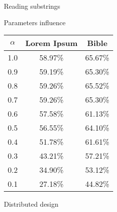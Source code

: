 \documentclass[aspectratio=169]{beamer}
\begin{document}
\begin{frame}{Reading substrings}\centering
  
\end{frame}


\begin{frame}{Parameters influence}
 \begin{table}
    \centering
    \begin{tabular}{c || c  c}
      $\alpha$ & Lorem Ipsum & Bible \\\hline\hline
      1.0 & 58.97\% & 65.67\% \\\hline
      0.9 & 59.19\% & 65.30\% \\\hline
      0.8 & 59.26\% & 65.52\% \\\hline
      0.7 & 59.26\% & 65.30\% \\\hline
      0.6 & 57.58\% & 61.13\% \\\hline
      0.5 & 56.55\% & 64.10\% \\\hline
      0.4 & 51.78\% & 61.61\% \\\hline
      0.3 & 43.21\% & 57.21\% \\\hline
      0.2 & 34.90\% & 53.12\% \\\hline
      0.1 & 27.18\% & 44.82\%
    \end{tabular}
  \end{table}
\end{frame}

\begin{frame}{Distributed design}
\end{frame}

\end{document}
